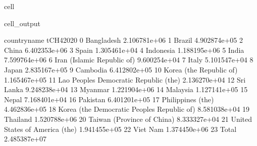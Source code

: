 \documentclass[letterpaper,10pt,english]{jupyterBook}
\begin{document}
\begin{sphinxuseclass}{cell}
\begin{sphinxVerbatimOutput}
\begin{sphinxuseclass}{cell_output}
\begin{sphinxVerbatim}[commandchars=\\\{\}]
                                   country\PYGZus{}name     tCH4\PYGZus{}2020  
0                                    Bangladesh  2.106781e+06  
1                                        Brazil  4.902874e+05  
2                                         China  6.402353e+06  
3                                         Spain  1.305461e+04  
4                                     Indonesia  1.188195e+06  
5                                         India  7.599764e+06  
6                    Iran (Islamic Republic of)  9.600254e+04  
7                                         Italy  5.101547e+04  
8                                         Japan  2.835167e+05  
9                                      Cambodia  6.412802e+05  
10                      Korea (the Republic of)  1.165467e+05  
11       Lao People\PYGZsq{}s Democratic Republic (the)  2.136270e+04  
12                                    Sri Lanka  9.248238e+04  
13                                      Myanmar  1.221904e+06  
14                                     Malaysia  1.127141e+05  
15                                        Nepal  7.168401e+04  
16                                     Pakistan  6.401201e+05  
17                            Philippines (the)  4.462836e+05  
18  Korea (the Democratic People\PYGZsq{}s Republic of)  8.581038e+04  
19                                     Thailand  1.520788e+06  
20                   Taiwan (Province of China)  8.333327e+04  
21               United States of America (the)  1.941455e+05  
22                                     Viet Nam  1.374450e+06  
23                                        Total  2.485387e+07  
\end{sphinxVerbatim}

\end{sphinxuseclass}\end{sphinxVerbatimOutput}

\end{sphinxuseclass}
\end{document}

